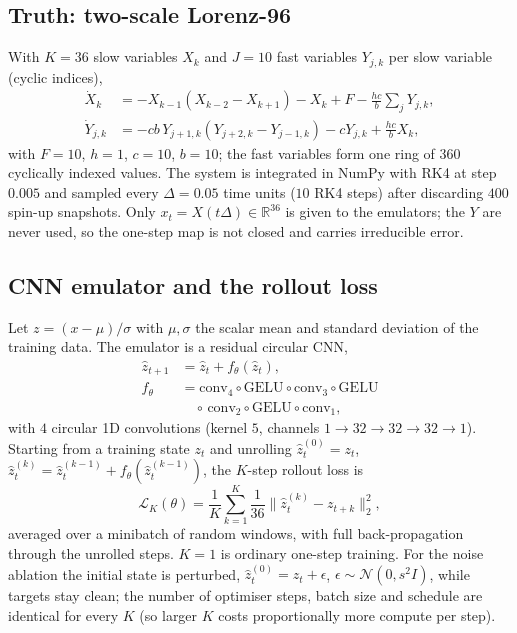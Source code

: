 \subsection{Truth: two-scale Lorenz-96}
With $K{=}36$ slow variables $X_k$ and $J{=}10$ fast variables $Y_{j,k}$ per slow variable (cyclic indices),
\begin{align}
\dot X_k &= -X_{k-1}(X_{k-2}-X_{k+1}) - X_k + F - \tfrac{hc}{b}\textstyle\sum_{j} Y_{j,k},\\
\dot Y_{j,k} &= -cb\,Y_{j+1,k}(Y_{j+2,k}-Y_{j-1,k}) - cY_{j,k} + \tfrac{hc}{b}X_k,
\end{align}
with $F{=}10$, $h{=}1$, $c{=}10$, $b{=}10$; the fast variables form one ring of $360$ cyclically indexed values. The system is integrated in NumPy with RK4 at step $0.005$ and sampled every $\Delta{=}0.05$ time units ($10$ RK4 steps) after discarding $400$ spin-up snapshots. Only $x_t=X(t\Delta)\in\mathbb R^{36}$ is given to the emulators; the $Y$ are never used, so the one-step map is not closed and carries irreducible error.

\subsection{CNN emulator and the rollout loss}
Let $z=(x-\mu)/\sigma$ with $\mu,\sigma$ the scalar mean and standard deviation of the training data. The emulator is a residual circular CNN,
\begin{equation}
\begin{split}\hat z_{t+1}&=\hat z_t+f_\theta(\hat z_t),\\ f_\theta&=\mathrm{conv}_4\circ\mathrm{GELU}\circ\mathrm{conv}_3\circ\mathrm{GELU}\\&\quad\circ\,\mathrm{conv}_2\circ\mathrm{GELU}\circ\mathrm{conv}_1,\end{split}
\end{equation}
with $4$ circular 1D convolutions (kernel $5$, channels $1\to32\to32\to32\to 1$). Starting from a training state $z_t$ and unrolling $\hat z_t^{(0)}=z_t$, $\hat z_t^{(k)}=\hat z_t^{(k-1)}+f_\theta(\hat z_t^{(k-1)})$, the $K$-step rollout loss is
\begin{equation}
\mathcal L_K(\theta)=\frac1K\sum_{k=1}^{K}\frac{1}{36}\Big\|\hat z_t^{(k)}-z_{t+k}\Big\|_2^2 ,
\end{equation}
averaged over a minibatch of random windows, with full back-propagation through the unrolled steps. $K{=}1$ is ordinary one-step training. For the noise ablation the initial state is perturbed, $\hat z_t^{(0)}=z_t+\epsilon$, $\epsilon\sim\mathcal N(0,s^2 I)$, while targets stay clean; the number of optimiser steps, batch size and schedule are identical for every $K$ (so larger $K$ costs proportionally more compute per step).

